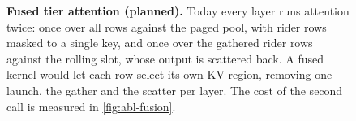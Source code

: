 \begin{figure}[t]
\caption{\textbf{Fused tier attention (planned).} Today every layer runs attention
twice: once over all rows against the paged pool, with rider rows masked to a
single key, and once over the gathered rider rows against the rolling slot, whose
output is scattered back. A fused kernel would let each row select its own KV
region, removing one launch, the gather and the scatter per layer. The cost of the
second call is measured in \cref{fig:abl-fusion}.
}
\label{fig:fused}
\end{figure}
